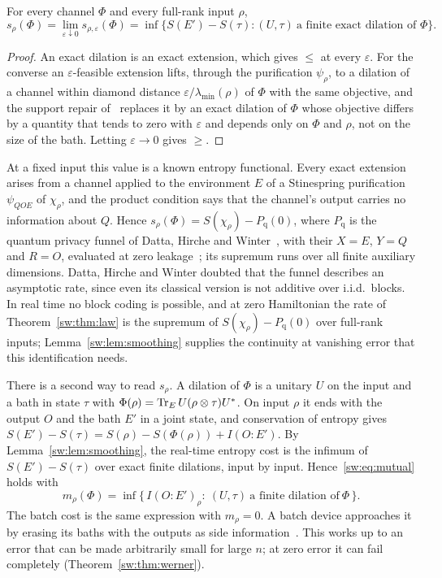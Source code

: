 \begin{lemma}\label{sw:lem:smoothing}
For every channel $\Phi$ and every full-rank input $\rho$,
\[
s_\rho(\Phi)=\lim_{\varepsilon\downarrow0}s_{\rho,\varepsilon}(\Phi)=\inf\bigl\{S(E')-S(\tau):(U,\tau)\ \text{a finite exact dilation of }\Phi\bigr\}.
\]
\end{lemma}
\begin{proof}
An exact dilation is an exact extension, which gives $\le$ at every $\varepsilon$. For the converse an $\varepsilon$-feasible extension lifts, through the purification $\psi_\rho$, to a dilation of a channel within diamond distance $\varepsilon/\lambda_{\min}(\rho)$ of $\Phi$ with the same objective, and the support repair of~\cite[Thm.~4.1 and Cor.~4.3]{Douglas26closed} replaces it by an exact dilation of $\Phi$ whose objective differs by a quantity that tends to zero with $\varepsilon$ and depends only on $\Phi$ and $\rho$, not on the size of the bath. Letting $\varepsilon\to0$ gives $\ge$.
\end{proof}
At a fixed input this value is a known entropy functional. Every exact extension arises from a channel applied to the environment $E$ of a Stinespring purification $\psi_{QOE}$ of $\chi_\rho$, and the product condition says that the channel's output carries no information about $Q$. Hence $s_\rho(\Phi)=S(\chi_\rho)-P_{\mathrm q}(0)$, where $P_{\mathrm q}$ is the quantum privacy funnel of Datta, Hirche and Winter~\cite[Sec.~V, Eq.~(22)]{DattaHircheWinter19}, with their $X=E$, $Y=Q$ and $R=O$, evaluated at zero leakage~\cite[Eq.~(1.3), Cor.~4.3]{Douglas26closed}; its supremum runs over all finite auxiliary dimensions. Datta, Hirche and Winter doubted that the funnel describes an asymptotic rate, since even its classical version is not additive over i.i.d.\ blocks. In real time no block coding is possible, and at zero Hamiltonian the rate of Theorem~\ref{sw:thm:law} is the supremum of $S(\chi_\rho)-P_{\mathrm q}(0)$ over full-rank inputs; Lemma~\ref{sw:lem:smoothing} supplies the continuity at vanishing error that this identification needs.

There is a second way to read $s_\rho$. A dilation of $\Phi$ is a unitary $U$ on the input and a bath in state $\tau$ with $\Phi(\rho)=\operatorname{Tr}_E U(\rho\otimes\tau)U^*$. On input $\rho$ it ends with the output $O$ and the bath $E'$ in a joint state, and conservation of entropy gives $S(E')-S(\tau)=S(\rho)-S(\Phi(\rho))+I(O{:}E')$. By Lemma~\ref{sw:lem:smoothing}, the real-time entropy cost is the infimum of $S(E')-S(\tau)$ over exact finite dilations, input by input. Hence~\eqref{sw:eq:mutual} holds with
\[
m_\rho(\Phi)=\inf\bigl\{\,I(O{:}E')_\rho:\ (U,\tau)\ \text{a finite dilation of}\ \Phi\,\bigr\}.
\]
The batch cost is the same expression with $m_\rho=0$. A batch device approaches it by erasing its baths with the outputs as side information~\cite[Sec.~7]{FBB21}. This works up to an error that can be made arbitrarily small for large $n$; at zero error it can fail completely (Theorem~\ref{sw:thm:werner}).

